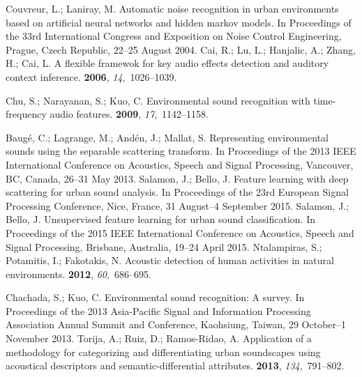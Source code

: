 \documentclass[sensors,article,accept,moreauthors,pdftex,10pt,a4paper]{mdpi}
\begin{document}
\begin{thebibliography}{999}
Couvreur, L.; Laniray, M.
\newblock Automatic noise recognition in urban environments based on artificial
  neural networks and hidden markov models.
\newblock  In Proceedings of the  33rd International Congress and Exposition on Noise Control
  Engineering, {Prague, Czech Republic,  22--25 August }2004.
Cai, R.; Lu, L.; Hanjalic, A.; Zhang, H.; Cai, L.
\newblock A flexible framewok for key audio effects detection and auditory
  context inference.
  {\bf 2006}, {\em 14},~1026--1039.

Chu, S.; Narayanan, S.; Kuo, C.
\newblock Environmental sound recognition with time-frequency audio features.
  {\bf 2009}, {\em 17},~1142--1158.

Baugé, C.; Lagrange, M.; Andén, J.; Mallat, S.
\newblock Representing environmental sounds using the separable scattering
  transform.
\newblock  In Proceedings of the 2013 IEEE International Conference on Acoustics, Speech and Signal
  Processing, {Vancouver, BC, Canada,  26--31 May } 2013.
Salamon, J.; Bello, J.
\newblock Feature learning with deep scattering for urban sound analysis.
\newblock  In  Proceedings of the 23rd European Signal Processing Conference,  {Nice, France, 31 August--4 September }2015.
Salamon, J.; Bello, J.
\newblock Unsupervised feature learning for urban sound classification.
\newblock In Proceedings of the 2015 IEEE International Conference on Acoustics, Speech and Signal
  Processing, {Brisbane,  Australia, 19--24 April } 2015.
Ntalampiras, S.; Potamitis, I.; Fakotakis, N.
\newblock Acoustic detection of human activities in natural environments.
 {\bf 2012}, {\em 60},~686--695.

Chachada, S.; Kuo, C.
\newblock Environmental sound recognition: A survey.
\newblock  In Proceedings of the 2013 Asia-Pacific Signal and Information Processing Association
  Annual Summit and Conference, {Kaohsiung, Taiwan, 29 October--1 November} 2013.
Torija, A.; Ruiz, D.; Ramos-Ridao, A.
\newblock Application of a methodology for categorizing and differentiating
  urban soundscapes using acoustical descriptors and semantic-differential
  attributes.
 {\bf 2013}, {\em 134},~791--802.


\end{thebibliography}
\end{document}
